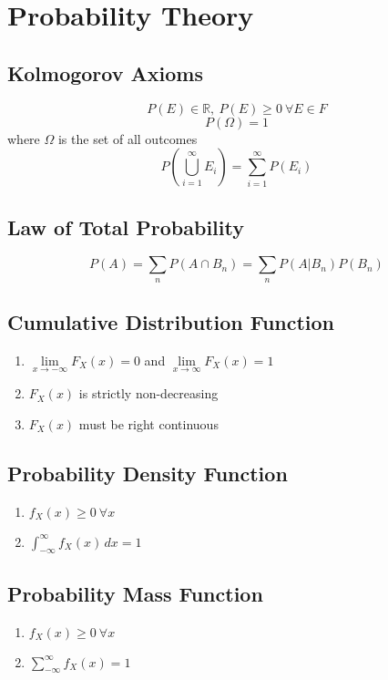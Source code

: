 \section{Probability Theory}
	\subsection*{Kolmogorov Axioms}
		\begin{equation}
			P(E) \in\mathbb{R},\ P(E)\geq 0\ \forall E\in F
		\end{equation}
		\begin{equation}
			P(\Omega) = 1
		\end{equation}
		where \(\Omega\) is the set of all outcomes
		\begin{equation}
			P\left(\bigcup_{i=1}^\infty E_i \right) = \sum_{i=1}^\infty P(E_i)
		\end{equation}
		
	\subsection*{Law of Total Probability}
		\[P(A) = \sum_{n} P(A\cap B_n)  = \sum_{n} P(A|B_n) P(B_n)\]
		
	\subsection*{Cumulative Distribution Function}
		\begin{enumerate}
			\item {\footnotesize\(\lim\limits_{x\rightarrow-\infty}F_X(x)=0\) and \(\lim\limits_{x\rightarrow\infty}F_X(x)=1\)}
			\item \(F_X(x)\) is strictly non-decreasing
			\item \(F_X(x)\) must be right continuous
		\end{enumerate}
	
	\subsection*{Probability Density Function}
		\begin{enumerate}
			\item \(f_X(x) \geq 0\ \forall x\)
			\item \(\int_{-\infty}^{\infty} f_X(x)\,dx = 1 \)
		\end{enumerate}

	\subsection*{Probability Mass Function}
		\begin{enumerate}
			\item \(f_X(x) \geq 0\ \forall x\)
			\item \(\sum_{-\infty}^{\infty} f_X(x) = 1 \)
		\end{enumerate}



